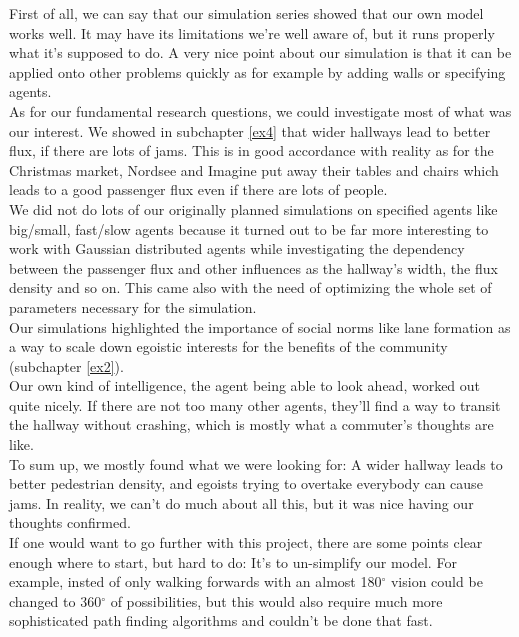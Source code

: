 
First of all, we can say that our simulation series showed that our own model works well. It may have its limitations we're well aware of, but it runs properly what it's supposed to do.
A very nice point about our simulation is that it can be applied onto other problems quickly as for example by adding walls or specifying agents.\\

\noi As for our fundamental research questions, we could investigate most of what was our interest. We showed in subchapter \ref{ex4} that wider hallways lead to better flux, if there are lots of jams. This is in good accordance with reality as for the Christmas market, Nordsee and Imagine put away their tables and chairs which leads to a good passenger flux even if there are lots of people.\\
We did not do lots of our originally planned simulations on specified agents like big/small, fast/slow agents because it turned out to be far more interesting to work with Gaussian distributed agents while investigating the dependency between the passenger flux and other influences as the hallway's width, the flux density and so on. This came also with the need of optimizing the whole set of parameters necessary for the simulation.\\
Our simulations highlighted the importance of social norms like lane formation as a way to scale down egoistic interests for the benefits of the community (subchapter \ref{ex2}).\\

Our own kind of intelligence, the agent being able to look ahead, worked out quite nicely. If there are not too many other agents, they'll find a way to transit the hallway without crashing, which is mostly what a commuter's thoughts are like.\\
To sum up, we mostly found what we were looking for: A wider hallway leads to better pedestrian density, and egoists trying to overtake everybody can cause jams. In reality, we can't do much about all this, but it was nice having our thoughts confirmed.\\

\noi If one would want to go further with this project, there are some points clear enough where to start, but hard to do: It's to un-simplify our model. For example, insted of only walking forwards with an almost 180$^\circ$ vision could be changed to 360$^\circ$ of possibilities, but this would also require much more sophisticated path finding algorithms and couldn't be done that fast.\\

